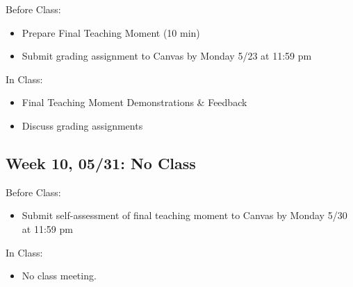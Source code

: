 \documentclass[11pt,]{article}
\providecommand{\tightlist}{%
  \setlength{\itemsep}{0pt}\setlength{\parskip}{0pt}}
\begin{document}
Before Class:

\begin{itemize}
\tightlist
\item
  Prepare Final Teaching Moment (10 min)
\item
  Submit grading assignment to Canvas by Monday 5/23 at 11:59 pm
\end{itemize}

In Class:

\begin{itemize}
\tightlist
\item
  Final Teaching Moment Demonstrations \& Feedback
\item
  Discuss grading assignments
\end{itemize}

\hypertarget{week-10-0531-no-class}{%
\subsection{Week 10, 05/31: No Class}\label{week-10-0531-no-class}}

Before Class:

\begin{itemize}
\tightlist
\item
  Submit self-assessment of final teaching moment to Canvas by Monday
  5/30 at 11:59 pm
\end{itemize}

In Class:

\begin{itemize}
\tightlist
\item
  No class meeting.
\end{itemize}
\end{document}
